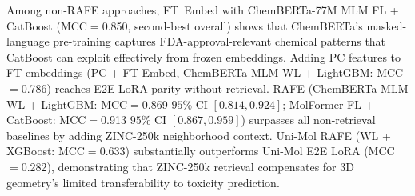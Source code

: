 \documentclass[9pt,twocolumn,conference]{IEEEtran}
\begin{document}
Among non-RAFE approaches, FT~Embed with ChemBERTa-77M MLM FL + CatBoost (MCC$=$0.850, second-best overall) shows that ChemBERTa's masked-language pre-training captures FDA-approval-relevant chemical patterns that CatBoost can exploit effectively from frozen embeddings. Adding PC features to FT embeddings (PC + FT Embed, ChemBERTa MLM WL + LightGBM: MCC$=$0.786) reaches E2E LoRA parity without retrieval. RAFE (ChemBERTa MLM WL + LightGBM: MCC$=$0.869 $95\%$ CI $[0.814, 0.924]$; MolFormer FL + CatBoost: MCC$=$0.913 $95\%$ CI $[0.867, 0.959]$) surpasses all non-retrieval baselines by adding ZINC-250k neighborhood context. Uni-Mol RAFE (WL + XGBoost: MCC$=$0.633) substantially
outperforms Uni-Mol E2E LoRA (MCC$=$0.282), demonstrating that ZINC-250k retrieval compensates for 3D geometry's limited transferability to toxicity prediction.
\end{document}

